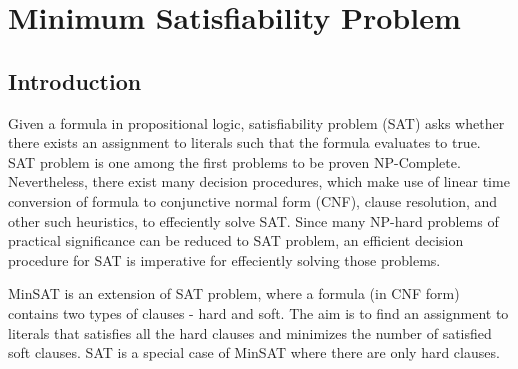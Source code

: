\section{Minimum Satisfiability Problem}
\label{sec:minsat}

\subsection{Introduction}
Given a formula in propositional logic, satisfiability problem (SAT) asks
whether there exists an assignment to literals such that the formula evaluates
to true. SAT problem is one among the first problems to be proven NP-Complete.
Nevertheless, there exist many decision procedures, which make use of linear
time conversion of formula to conjunctive normal form (CNF), clause resolution,
and other such heuristics, to effeciently solve SAT.  Since many NP-hard
problems of practical significance can be reduced to SAT problem, an efficient
decision procedure for SAT is imperative for effeciently solving those problems.

MinSAT is an extension of SAT problem, where a formula (in CNF form) contains
two types of clauses - hard and soft. The aim is to find an assignment to
literals that satisfies all the hard clauses and minimizes the number of
satisfied soft clauses. SAT is a special case of MinSAT where there are only
hard clauses. 

